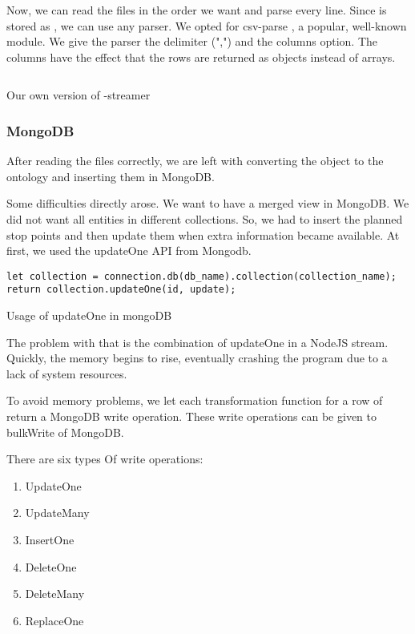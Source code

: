 Now, we can read the files in the order we want and parse every line. Since  is stored as , we can use any  parser. We opted for csv-parse \cite{noauthor_csv-parse_2024}, a popular, well-known module. We give the parser the delimiter (",") and the columns option. The columns have the effect that the rows are returned as  objects instead of arrays.

\begin{listing}[H]
\inputminted[linenos,frame=single,breaklines]{TypeScript}{code/own_gtfs_streamer.js}
    \caption{Our own version of -streamer}
\label{listing:gtfs:streamer}
\end{listing}


\subsubsection{MongoDB}
After reading the  files correctly, we are left with converting the  object to the ontology and inserting them in MongoDB.

Some difficulties directly arose. We want to have a merged view in MongoDB. We did not want all entities in different collections. So, we had to insert the planned stop points and then update them when extra information became available. At first, we used the updateOne API from Mongodb. 
\begin{listing}[H]
    \begin{verbatim}
let collection = connection.db(db_name).collection(collection_name);
return collection.updateOne(id, update);
    \end{verbatim}
    \caption{Usage of updateOne in mongoDB}
\label{listing:mongoDB:updateone}
\end{listing}
The problem with that is the combination of updateOne in a NodeJS stream. Quickly, the memory begins to rise, eventually crashing the program due to a lack of system resources.

To avoid memory problems, we let each transformation function for a row of  return a MongoDB write operation. These write operations can be given to bulkWrite of MongoDB. 

There are six types Of write operations:
\begin{enumerate}
    \item UpdateOne
    \item UpdateMany
    \item InsertOne
    \item DeleteOne
    \item DeleteMany
    \item ReplaceOne
\end{enumerate}

